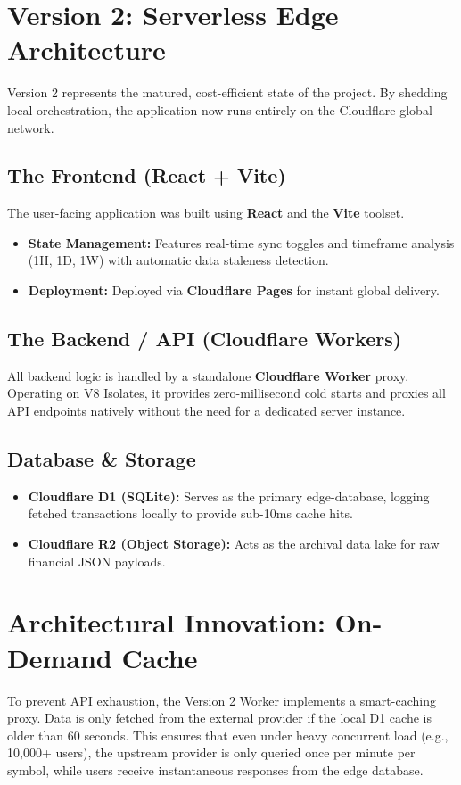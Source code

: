 \documentclass[12pt,a4paper]{article}
\begin{document}
\section{Version 2: Serverless Edge Architecture}
Version 2 represents the matured, cost-efficient state of the project. By shedding local orchestration, the application now runs entirely on the Cloudflare global network.

\subsection{The Frontend (React + Vite)}
The user-facing application was built using \textbf{React} and the \textbf{Vite} toolset.
\begin{itemize}
    \item \textbf{State Management:} Features real-time sync toggles and timeframe analysis (1H, 1D, 1W) with automatic data staleness detection.
    \item \textbf{Deployment:} Deployed via \textbf{Cloudflare Pages} for instant global delivery.
\end{itemize}

\subsection{The Backend / API (Cloudflare Workers)}
All backend logic is handled by a standalone \textbf{Cloudflare Worker} proxy. Operating on V8 Isolates, it provides zero-millisecond cold starts and proxies all API endpoints natively without the need for a dedicated server instance.

\subsection{Database \& Storage}
\begin{itemize}
    \item \textbf{Cloudflare D1 (SQLite):} Serves as the primary edge-database, logging fetched transactions locally to provide sub-10ms cache hits.
    \item \textbf{Cloudflare R2 (Object Storage):} Acts as the archival data lake for raw financial JSON payloads.
\end{itemize}

\section{Architectural Innovation: On-Demand Cache}
To prevent API exhaustion, the Version 2 Worker implements a smart-caching proxy. Data is only fetched from the external provider if the local D1 cache is older than 60 seconds. This ensures that even under heavy concurrent load (e.g., 10,000+ users), the upstream provider is only queried once per minute per symbol, while users receive instantaneous responses from the edge database.
\end{document}
